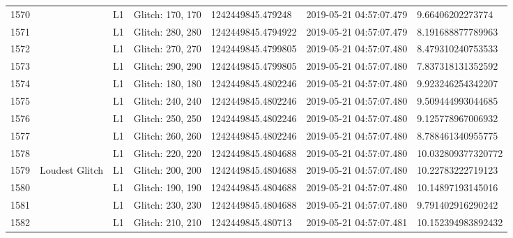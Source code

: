 \begin{longtable}{lllllll}
1570 &                                                    &       L1 &  Glitch: 170, 170 &   1242449845.479248 &  2019-05-21 04:57:07.479 &    9.66406202273774 \\
1571 &                                                    &       L1 &  Glitch: 280, 280 &  1242449845.4794922 &  2019-05-21 04:57:07.479 &   8.191688877789963 \\
1572 &                                                    &       L1 &  Glitch: 270, 270 &  1242449845.4799805 &  2019-05-21 04:57:07.480 &   8.479310240753533 \\
1573 &                                                    &       L1 &  Glitch: 290, 290 &  1242449845.4799805 &  2019-05-21 04:57:07.480 &   7.837318131352592 \\
1574 &                                                    &       L1 &  Glitch: 180, 180 &  1242449845.4802246 &  2019-05-21 04:57:07.480 &   9.923246254342207 \\
1575 &                                                    &       L1 &  Glitch: 240, 240 &  1242449845.4802246 &  2019-05-21 04:57:07.480 &   9.509444993044685 \\
1576 &                                                    &       L1 &  Glitch: 250, 250 &  1242449845.4802246 &  2019-05-21 04:57:07.480 &   9.125778967006932 \\
1577 &                                                    &       L1 &  Glitch: 260, 260 &  1242449845.4802246 &  2019-05-21 04:57:07.480 &   8.788461340955775 \\
1578 &                                                    &       L1 &  Glitch: 220, 220 &  1242449845.4804688 &  2019-05-21 04:57:07.480 &  10.032809377320772 \\
1579 &                                     Loudest Glitch &       L1 &  Glitch: 200, 200 &  1242449845.4804688 &  2019-05-21 04:57:07.480 &   10.22783222719123 \\
1580 &                                                    &       L1 &  Glitch: 190, 190 &  1242449845.4804688 &  2019-05-21 04:57:07.480 &   10.14897193145016 \\
1581 &                                                    &       L1 &  Glitch: 230, 230 &  1242449845.4804688 &  2019-05-21 04:57:07.480 &   9.791402916290242 \\
1582 &                                                    &       L1 &  Glitch: 210, 210 &   1242449845.480713 &  2019-05-21 04:57:07.481 &  10.152394983892432 \\

\end{longtable}
